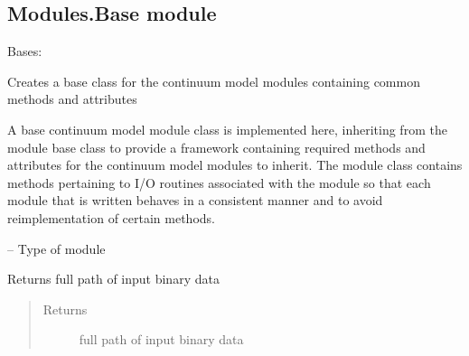 \documentclass[letterpaper,10pt,english]{sphinxmanual}
\begin{document}
\subsection{Modules.Base module}
\label{\detokenize{MouseReferenceManual:modules-base-module}}\label{\detokenize{MouseReferenceManual:module-Modules.Base}}

\begin{fulllineitems}
\label{\detokenize{MouseReferenceManual:Modules.Base.ContinuumModuleBaseClass}}
Bases: {\hyperref[\detokenize{MouseReferenceManual:Modules.Base.ModuleBaseClass}]{}}

Creates a base class for the continuum model modules containing common methods and attributes

A base continuum model module class is implemented here, inheriting from the module base class to provide a framework containing required methods and attributes for the continuum model modules to inherit. The module class contains methods pertaining to I/O routines associated with the module so that each module that is written behaves in a consistent manner and to avoid reimplementation of certain methods.

\begin{fulllineitems}
\label{\detokenize{MouseReferenceManual:Modules.Base.ContinuumModuleBaseClass.type}}
 -- Type of module

\end{fulllineitems}


\begin{fulllineitems}
\label{\detokenize{MouseReferenceManual:Modules.Base.ContinuumModuleBaseClass.inputFileName}}
Returns full path of input binary data
\begin{quote}\begin{description}
\item[{Returns}] \leavevmode
full path of input binary data


\end{description}
\end{quote}
\end{fulllineitems}
\end{fulllineitems}
\end{document}
